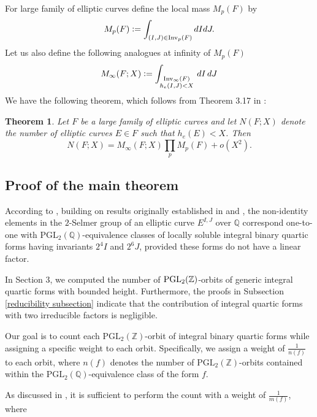 \documentclass{article}
\def\PGL{{\rm PGL}}
\def\Inv{{\rm Inv}}
\def \h{{\rm ht}}
\newtheorem{theorem}{Theorem}[section]
\begin{document}
For large family of elliptic curves define the local mass $M_p(F)$ by
\begin{equation}\label{M_p(F)-def}
M_p(F) \vcentcolon= \int_{(I,J) \in \Inv_p(F)}dIdJ.
\end{equation}
Let us also define the following analogues at infinity of $M_p(F)$
\begin{equation*}
    M_{\infty}(F;X) \vcentcolon= \int_{\substack{\Inv_{\infty}(F)\\h_e(I,J)<X}} \,dI\,dJ
\end{equation*}
We have the following theorem, which follows from Theorem 3.17 in \cite{main}:
\begin{theorem}\label{elliptic-counting}
    Let $F$ be a large family of elliptic curves and let $N(F;X)$ denote the number of elliptic curves $E\in F$ such that $h_e(E)<X$. Then 
\begin{equation*}
        N(F;X) = M_{\infty}(F;X) \prod_p M_p(F) + o(X^2).    \end{equation*}
\end{theorem}

\subsection{Proof of the main theorem}
According to \cite{main}, building on results originally established in \cite{birch1963notes} and \cite{cremona2008algorithms}, the non-identity elements in the $2$-Selmer group of an elliptic curve $E^{I,J}$ over $\mathbb{Q}$ correspond one-to-one with $\text{PGL}_2(\mathbb{Q})$-equivalence classes of locally soluble integral binary quartic forms having invariants $2^4I$ and $2^6J$, provided these forms do not have a linear factor.

In Section 3, we computed the number of $\PGL_2(\mathbb{Z})$-orbits of generic integral quartic forms with bounded height. Furthermore, the proofs in Subsection \ref{reducibility subsection} indicate that the contribution of integral quartic forms with two irreducible factors is negligible.

Our goal is to count each $\text{PGL}_2(\mathbb{Z})$-orbit of integral binary quartic forms while assigning a specific weight to each orbit. Specifically, we assign a weight of $\frac{1}{n(f)}$ to each orbit, where $n(f)$ denotes the number of $\text{PGL}_2(\mathbb{Z})$-orbits contained within the $\text{PGL}_2(\mathbb{Q})$-equivalence class of the form $f$.

As discussed in \cite{main}, it is  sufficient to perform the count with a weight of $\frac{1}{m(f)}$, where  
\end{document}
